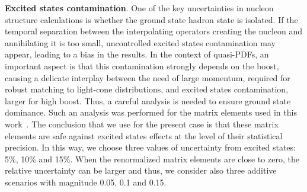 \textbf{Excited states contamination}. One of the key uncertainties in nucleon
structure calculations is whether the ground state hadron state is isolated. If
the temporal separation between the interpolating operators creating the nucleon
and annihilating it is too small, uncontrolled excited states contamination may
appear, leading to a bias in the results. In the context of quasi-PDFs, an
important aspect is that this contamination strongly depends on the boost,
causing a delicate interplay between the need of large momentum, required for
robust matching to light-cone distributions, and excited states contamination,
larger for high boost. Thus, a careful analysis is needed to ensure ground state
dominance. Such an analysis was performed for the matrix elements used in this
work~\cite{Alexandrou:2019lfo}. The conclusion that we use for the present case
is that these matrix elements are safe against excited states effects at the
level of their statistical precision. In this way, we choose three values of
uncertainty from excited states: 5\%, 10\% and 15\%. When the renormalized
matrix elements are close to zero, the relative uncertainty can be larger and
thus, we consider also three additive scenarios with magnitude 0.05, 0.1 and
0.15.

